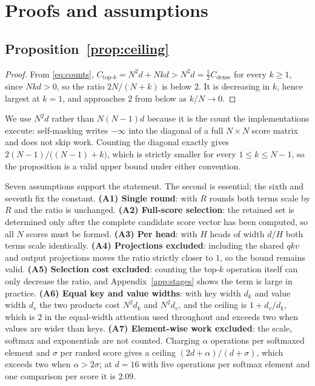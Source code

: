 \section{Proofs and assumptions}
\label{app:theory}

\subsection{Proposition~\ref{prop:ceiling}}

\begin{proof}
From \eqref{eq:counts}, $C_{\text{top-}k} = N^2 d + Nkd > N^2 d =
\tfrac12 C_{\text{dense}}$ for every $k \ge 1$, since $Nkd > 0$, so the ratio
$2N/(N+k)$ is below $2$. It is decreasing in $k$, hence largest at $k = 1$, and
approaches $2$ from below as $k/N \to 0$.
\end{proof}

We use $N^2 d$ rather than $N(N{-}1)d$ because it is the count the
implementations execute: self-masking writes $-\infty$ into the diagonal of a
full $N \times N$ score matrix and does not skip work. Counting the diagonal
exactly gives $2(N{-}1)/\bigl((N{-}1)+k\bigr)$, which is strictly smaller for
every $1 \le k \le N-1$, so the proposition is a valid upper bound under either
convention.

Seven assumptions support the statement. The second is essential; the sixth and seventh fix the constant.
\textbf{(A1) Single round}: with $R$ rounds both terms scale by $R$ and the
ratio is unchanged. \textbf{(A2) Full-score selection}: the retained set is
determined only after the complete candidate score vector has been computed, so
all $N$ scores must be formed. \textbf{(A3) Per head}: with $H$ heads of width
$d/H$ both terms scale identically. \textbf{(A4) Projections excluded}:
including the shared $qkv$ and output projections moves the ratio strictly
closer to $1$, so the bound remains valid. \textbf{(A5) Selection cost
excluded}: counting the top-$k$ operation itself can only decrease the ratio,
and Appendix~\ref{app:stages} shows the term is large in practice.
\textbf{(A6) Equal key and value widths}: with key width $d_k$ and value width
$d_v$ the two products cost $N^2 d_k$ and $N^2 d_v$, and the ceiling is
$1 + d_v/d_k$, which is $2$ in the equal-width attention used throughout and
exceeds two when values are wider than keys. \textbf{(A7) Element-wise work
excluded}: the scale, softmax and exponentials are not counted. Charging
$\alpha$ operations per softmaxed element and $\sigma$ per ranked score gives a
ceiling $(2d+\alpha)/(d+\sigma)$, which exceeds two when $\alpha > 2\sigma$; at
$d{=}16$ with five operations per softmax element and one comparison per score
it is $2.09$.

